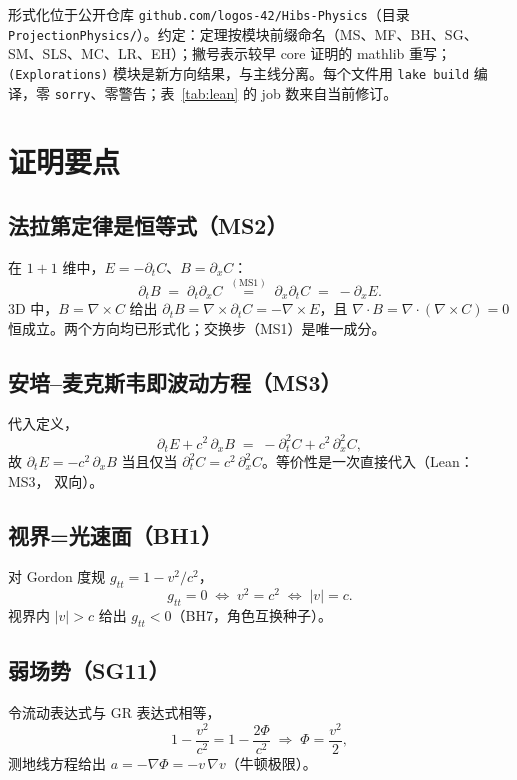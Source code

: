 \documentclass[aps,prd,preprint,superscriptaddress,amsmath,amssymb]{revtex4-2}
\begin{document}
形式化位于公开仓库 \texttt{github.com/logos-42/Hibs-Physics}（目录
\texttt{ProjectionPhysics/}）。约定：定理按模块前缀命名（MS、MF、BH、SG、
SM、SLS、MC、LR、EH）；撇号表示较早 core 证明的 mathlib 重写；
\texttt{(Explorations)} 模块是新方向结果，与主线分离。每个文件用
\texttt{lake build} 编译，零 \texttt{sorry}、零警告；表~\ref{tab:lean} 的
job 数来自当前修订。

\section{证明要点}\label{app:proofs}

\subsection{法拉第定律是恒等式（MS2）}\label{app:faraday}

在 $1{+}1$ 维中，$E=-\partial_t C$、$B=\partial_x C$：
\[
\partial_t B \;=\; \partial_t\partial_x C
\;\overset{\mathrm{(MS1)}}{=}\;
\partial_x\partial_t C \;=\; -\partial_x E .
\]
3D 中，$B=\nabla\times C$ 给出 $\partial_t B=\nabla\times\partial_t C
=-\nabla\times E$，且 $\nabla\cdot B=\nabla\cdot(\nabla\times C)=0$
恒成立。两个方向均已形式化；交换步（MS1）是唯一成分。

\subsection{安培--麦克斯韦即波动方程（MS3）}\label{app:ampere}

代入定义，
\[
\partial_t E + c^2\,\partial_x B
\;=\; -\partial_t^2 C + c^2\,\partial_x^2 C ,
\]
故 $\partial_t E = -c^2\,\partial_x B$ 当且仅当
$\partial_t^2 C = c^2\,\partial_x^2 C$。等价性是一次直接代入（Lean：MS3，
双向）。

\subsection{视界=光速面（BH1）}\label{app:bh}

对 Gordon 度规 $g_{tt}=1-v^2/c^2$，
\[
g_{tt}=0 \;\Longleftrightarrow\; v^2=c^2 \;\Longleftrightarrow\; |v|=c .
\]
视界内 $|v|>c$ 给出 $g_{tt}<0$（BH7，角色互换种子）。

\subsection{弱场势（SG11）}\label{app:sg11}

令流动表达式与 GR 表达式相等，
\[
1-\frac{v^2}{c^2} = 1-\frac{2\Phi}{c^2}
\;\Longrightarrow\; \Phi = \frac{v^2}{2},
\]
测地线方程给出 $a=-\nabla\Phi=-v\,\nabla v$（牛顿极限）。
\end{document}
